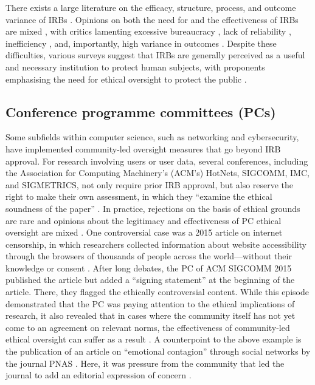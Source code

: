 \documentclass[11pt,english]{article}
\begin{document}
	There exists a large literature on the efficacy, structure, process, and outcome variance of IRBs \citep{abbott_systematic_2011}. Opinions on both the need for and the effectiveness of IRBs are mixed \citep{hyman_institutional_2007}, with critics lamenting excessive bureaucracy \citep{zywicki_institutional_2007}, lack of reliability \citep{whitney_principal_2008}, inefficiency \citep{chadwick_institutional_2000,fost_dysregulation_2007}, and, importantly, high variance in outcomes \citep{dziak_variations_2005,larson_survey_2004,shah_how_2004,mcwilliams_problematic_2003,goldman_inconsistency_1982}. Despite these difficulties, various surveys suggest that IRBs are generally perceived as a useful and necessary institution to protect human subjects, with proponents emphasising the need for ethical oversight to protect the public \citep{reeser_investigating_2008,stryjewski_impact_2015,keith-spiegel_what_2006,saleem_institutional_2011,chadwick_institutional_2000}. 
	
	\subsection*{Conference programme committees (PCs)}
	
	Some subfields within computer science, such as networking and cybersecurity, have implemented community-led oversight measures that go beyond IRB approval. For research involving users or user data, several conferences, including the Association for Computing Machinery's (ACM's) HotNets, SIGCOMM, IMC, and SIGMETRICS, not only require prior IRB approval, but also reserve the right to make their own assessment, in which they ``examine the ethical soundness of the paper'' \citep{acm_sigmetrics_call_2020}. In practice, rejections on the basis of ethical grounds are rare and opinions about the legitimacy and effectiveness of PC ethical oversight are mixed \citep{narayanan_no_2015,kenneally_cyber-security_2014}. One controversial case was a 2015 article on internet censorship, in which researchers collected information about website accessibility through the browsers of thousands of people across the world---without their knowledge or consent \citep{burnett_encore_2015}. After long debates, the PC of ACM SIGCOMM 2015 published the article but added a ``signing statement'' at the beginning of the article. There, they flagged the ethically controversial content. While this episode demonstrated that the PC was paying attention to the ethical implications of research, it also revealed that in cases where the community itself has not yet come to an agreement on relevant norms, the effectiveness of community-led ethical oversight can suffer as a result \citep{kenneally_cyber-security_2014}. A counterpoint to the above example is the publication of an article on ``emotional contagion'' through social networks by the journal PNAS \citep{kramer_experimental_2014}. Here, it was pressure from the community that led the journal to add an editorial expression of concern \citep{pnas_editorial_2014}.
	
\end{document}
